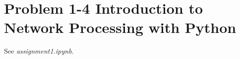 \section{Problem 1-4 Introduction to Network Processing with Python}

See \textit{assignment1.ipynb}.